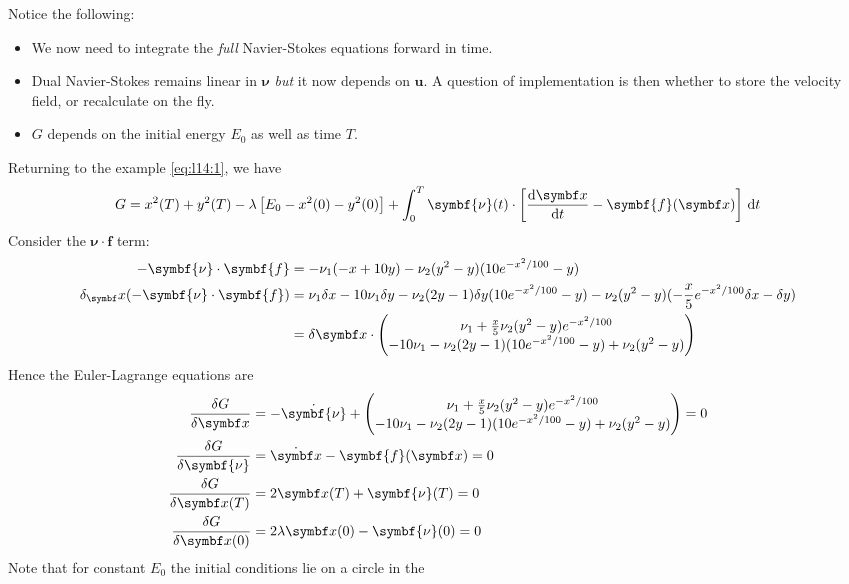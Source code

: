 \documentclass{jknotes}
\renewcommand{\u}{\symbf{u}}
\begin{document}
Notice the following:
\begin{itemize}
	\item We now need to integrate the \emph{full} Navier-Stokes equations
		forward in time.
	\item Dual Navier-Stokes remains linear in $\symbf{\nu}$ \emph{but} it now
		depends on $\u$. A question of implementation is then whether to store
		the velocity field, or recalculate on the fly.
	\item $G$ depends on the initial energy $E_0$ as well as time $T$.
\end{itemize}

Returning to the example \eqref{eq:l14:1}, we have
\begin{equation}
	G = x^2(T) + y^2(T) -\lambda\left[E_0 -x^2(0) - y^2(0)\right] + \int_0^T
	\symbf{\nu}(t) \cdot \left[ \frac{\diffd \x}{\diffd t} - \symbf{f}(\x) \right] \,
	\diffd t
\end{equation}
Consider the $\symbf{\nu}\cdot\symbf{f}$ term:
\begin{align}
	-\symbf{\nu}\cdot\symbf{f} &= -\nu_1(-x+10y) - \nu_2
	(y^2-y)(10e^{-x^2/100}-y) \\
	\delta_\x (-\symbf{\nu}\cdot\symbf{f}) &= \nu_1 \delta x - 10\nu_1 \delta
	y - \nu_2 (2y-1)\delta y(10e^{-x^2/100}-y) -
	\nu_2(y^2-y)(-\frac{x}{5}e^{-x^2/100}\delta x - \delta y) \\
	&= \delta \x \cdot \begin{pmatrix}
		\nu_1 + \frac{x}{5}\nu_2 (y^2-y)e^{-x^2/100} \\
		-10\nu_1 - \nu_2(2y-1)(10e^{-x^2/100}-y)+\nu_2(y^2-y)
	\end{pmatrix}
\end{align}
Hence the Euler-Lagrange equations are
\begin{align}
	\frac{\delta G}{\delta \x} &= -\dot{\symbf{\nu}} + \begin{pmatrix} \nu_1 +
		\frac{x}{5}\nu_2(y^2-y)e^{-x^2/100} \\ -10\nu_1 -
	\nu_2(2y-1)(10e^{-x^2/100} -y)+\nu_2(y^2-y) \end{pmatrix} = 0\\
	\frac{\delta G}{\delta \symbf{\nu}} &= \dot{\x} - \symbf{f}(\x) = 0 \\
	\frac{\delta G}{\delta \x(T)} &=  2\x(T) + \symbf{\nu}(T) = 0 \\
	\frac{\delta G}{\delta \x(0)} &= 2\lambda \x(0) - \symbf{\nu}(0) = 0
\end{align}
Note that for constant $E_0$ the initial conditions lie on a circle in the
\end{document}
